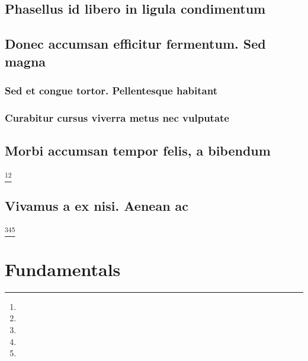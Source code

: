 \documentclass[%
  german,%
  exercise,%
  oneside,%
]{iswartcl}
\begin{document}
\tableofcontents

\listoffigures

\listoftables

\printglossary[type=\acronymtype]


\listoftodos

\mainmatter


\section{Phasellus id libero in ligula condimentum}

\lipsum[1-8]

\section{Donec accumsan efficitur fermentum. Sed magna}

\lipsum[1-8]

\subsection{Sed et congue tortor. Pellentesque habitant}

\lipsum[1-8]

\subsection{Curabitur cursus viverra metus nec vulputate}

\lipsum[1-8]

\section{Morbi accumsan tempor felis, a bibendum}

\lipsum[1-8]\footnote{\lipsum[1]}\footnote{\lipsum[1]}

\section{Vivamus a ex nisi. Aenean ac}

\lipsum[1-8]\footnote{\lipsum[1]}\footnote{\lipsum[1]}\footnote{\lipsum[1]}



\chapter{Fundamentals}
\end{document}
